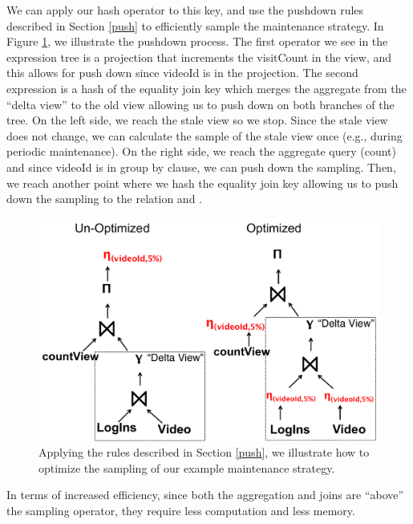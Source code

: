 We can apply our hash operator to this key, and use the pushdown rules described in Section \ref{push} to efficiently sample the maintenance strategy.
In Figure \ref{exexpr2}, we illustrate the pushdown process.
The first operator we see in the expression tree is a projection that increments the \textsf{visitCount} in the view, and this allows
for push down since \textsf{videoId} is in the projection.
The second expression is a hash of the equality join key which merges the aggregate from the ``delta view'' to the old view allowing us to push down on both branches of the tree.
On the left side, we reach the stale view so we stop.
Since the stale view does not change, we can calculate the sample of the stale view once (e.g., during periodic maintenance). 
On the right side, we reach the aggregate query (count) and since \textsf{videoId} is in group by clause, we can push down the sampling.
Then, we reach another point where we hash the equality join key allowing us to push down the sampling to the relation  and .

\begin{figure}[t] \vspace{-2em}
\centering
 \includegraphics[scale=0.24]{figs/example_expression_tree_2.pdf} \vspace{-.5em}
 \caption{Applying the rules described in Section \ref{push}, we illustrate how to optimize the sampling of our example maintenance strategy.  \label{exexpr2}}\vspace{-1.75em}
\end{figure}

In terms of increased efficiency, since both the aggregation and joins are ``above'' the sampling operator, they require less computation and less memory.


